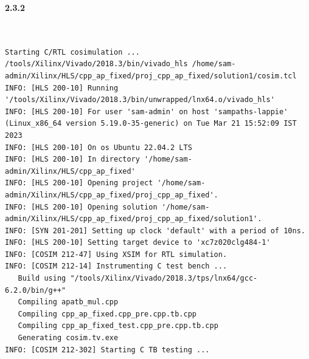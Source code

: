 \documentclass{article}
\begin{document}
\vspace{2cm}
\textbf{2.3.2}
\begin{lstlisting}


Starting C/RTL cosimulation ...
/tools/Xilinx/Vivado/2018.3/bin/vivado_hls /home/sam-admin/Xilinx/HLS/cpp_ap_fixed/proj_cpp_ap_fixed/solution1/cosim.tcl
INFO: [HLS 200-10] Running '/tools/Xilinx/Vivado/2018.3/bin/unwrapped/lnx64.o/vivado_hls'
INFO: [HLS 200-10] For user 'sam-admin' on host 'sampaths-lappie' (Linux_x86_64 version 5.19.0-35-generic) on Tue Mar 21 15:52:09 IST 2023
INFO: [HLS 200-10] On os Ubuntu 22.04.2 LTS
INFO: [HLS 200-10] In directory '/home/sam-admin/Xilinx/HLS/cpp_ap_fixed'
INFO: [HLS 200-10] Opening project '/home/sam-admin/Xilinx/HLS/cpp_ap_fixed/proj_cpp_ap_fixed'.
INFO: [HLS 200-10] Opening solution '/home/sam-admin/Xilinx/HLS/cpp_ap_fixed/proj_cpp_ap_fixed/solution1'.
INFO: [SYN 201-201] Setting up clock 'default' with a period of 10ns.
INFO: [HLS 200-10] Setting target device to 'xc7z020clg484-1'
INFO: [COSIM 212-47] Using XSIM for RTL simulation.
INFO: [COSIM 212-14] Instrumenting C test bench ...
   Build using "/tools/Xilinx/Vivado/2018.3/tps/lnx64/gcc-6.2.0/bin/g++"
   Compiling apatb_mul.cpp
   Compiling cpp_ap_fixed.cpp_pre.cpp.tb.cpp
   Compiling cpp_ap_fixed_test.cpp_pre.cpp.tb.cpp
   Generating cosim.tv.exe
INFO: [COSIM 212-302] Starting C TB testing ... 



\end{lstlisting}
\end{document}
